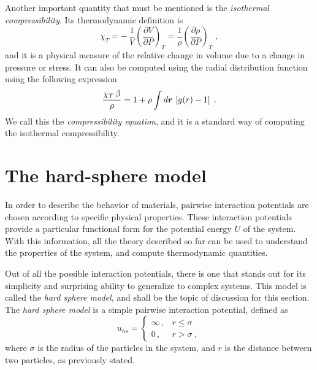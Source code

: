 Another important quantity that must be mentioned is the
\emph{isothermal compressibility}. Its thermodynamic definition is
\begin{equation}
    \chi_{T} = - \, \frac{1}{V} { \left( \frac{\partial V}{\partial P} \right) }_{T} =
    \frac{1}{\rho} { \left( \frac{\partial \rho}{\partial P} \right) }_{T}
    \; ,
    \label{eq:isothermal-chi}
\end{equation}
and it is a physical measure of the relative change in volume due to a change
in pressure or stress.
It can also be computed using the radial distribution function using the following
expression~\cite{hansenTheorySimpleLiquids2013}
\begin{equation}
    \frac{\chi_{T} \, \beta}{\rho} = 1 + \rho \int d \bm{r} \, \left[ g(r) - 1 \right]
    \; .
    \label{eq:chi-rdf}
\end{equation}
We call this the \emph{compressibility equation}, and it is a standard way of computing
the isothermal compressibility.

\section{The hard-sphere model}
In order to describe the behavior of materials, pairwise interaction potentials are chosen 
according to specific physical properties. These interaction potentials provide a 
particular functional form for the potential energy $U$ of the system.
With this information, all the theory described so far can be used to understand the
properties of the system, and compute thermodynamic quantities.

Out of all the possible interaction potentials, there is one that stands out for its
simplicity and surprising ability to generalize to complex systems. This model is
called the \emph{hard sphere model}, and shall be the topic of discussion for this
section.
The \emph{hard sphere model} is a simple pairwise interaction potential, defined as
\begin{equation}
    u_{hs} = 
    \begin{cases}
        \infty \, , &r \leq \sigma \\
        0 \, , &r > \sigma \; ,
    \end{cases}
    \label{eq:hard-sphere}
\end{equation}
where $\sigma$ is the radius of the particles in the system, and $r$ is the distance
between two particles, as previously stated.

